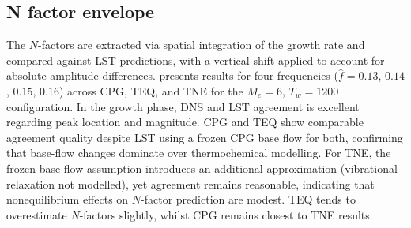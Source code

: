 
\subsection{N factor envelope}
The $N$-factors are extracted via spatial integration of the growth rate and compared against \gls{LST} predictions, with a vertical shift applied to account for absolute amplitude differences.  presents results for four frequencies ($\hat{f}=0.13$, $0.14$, $0.15$, $0.16$) across \gls{CPG}, \gls{TEQ}, and \gls{TNE} for the $M_e=6$, $T_w=1200$ configuration. In the growth phase, \gls{DNS} and \gls{LST} agreement is excellent regarding peak location and magnitude. \gls{CPG} and \gls{TEQ} show comparable agreement quality despite \gls{LST} using a frozen \gls{CPG} base flow for both, confirming that base-flow changes dominate over thermochemical modelling. For \gls{TNE}, the frozen base-flow assumption introduces an additional approximation (vibrational relaxation not modelled), yet agreement remains reasonable, indicating that nonequilibrium effects on $N$-factor prediction are modest. \gls{TEQ} tends to overestimate $N$-factors slightly, whilst \gls{CPG} remains closest to \gls{TNE} results.

